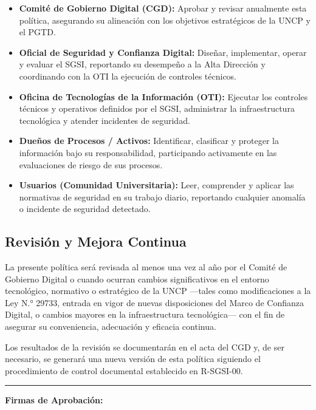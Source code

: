 \documentclass[10pt,letterpaper]{article}
\begin{document}
\begin{itemize}
\tightlist
\item
  \textbf{Comité de Gobierno Digital (CGD):} Aprobar y revisar
  anualmente esta política, asegurando su alineación con los objetivos
  estratégicos de la UNCP y el PGTD.
\item
  \textbf{Oficial de Seguridad y Confianza Digital:} Diseñar,
  implementar, operar y evaluar el SGSI, reportando su desempeño a la
  Alta Dirección y coordinando con la OTI la ejecución de controles
  técnicos.
\item
  \textbf{Oficina de Tecnologías de la Información (OTI):} Ejecutar los
  controles técnicos y operativos definidos por el SGSI, administrar la
  infraestructura tecnológica y atender incidentes de seguridad.
\item
  \textbf{Dueños de Procesos / Activos:} Identificar, clasificar y
  proteger la información bajo su responsabilidad, participando
  activamente en las evaluaciones de riesgo de sus procesos.
\item
  \textbf{Usuarios (Comunidad Universitaria):} Leer, comprender y
  aplicar las normativas de seguridad en su trabajo diario, reportando
  cualquier anomalía o incidente de seguridad detectado.
\end{itemize}

\subsection{Revisión y Mejora
Continua}\label{revisiuxf3n-y-mejora-continua}

La presente política será revisada al menos una vez al año por el Comité
de Gobierno Digital o cuando ocurran cambios significativos en el
entorno tecnológico, normativo o estratégico de la UNCP ---tales como
modificaciones a la Ley N.° 29733, entrada en vigor de nuevas
disposiciones del Marco de Confianza Digital, o cambios mayores en la
infraestructura tecnológica--- con el fin de asegurar su conveniencia,
adecuación y eficacia continua.

Los resultados de la revisión se documentarán en el acta del CGD y, de
ser necesario, se generará una nueva versión de esta política siguiendo
el procedimiento de control documental establecido en R-SGSI-00.

\begin{center}\rule{0.5\linewidth}{0.5pt}\end{center}

\textbf{Firmas de Aprobación:}
\end{document}
